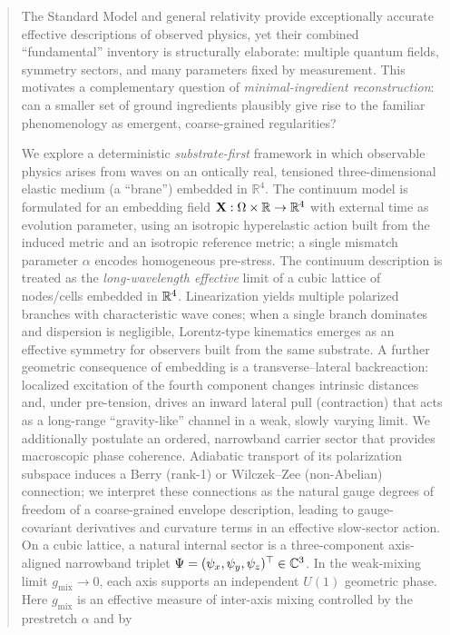 \begin{abstract}
The Standard Model and general relativity provide exceptionally accurate effective descriptions of observed physics,
yet their combined ``fundamental'' inventory is structurally elaborate: multiple quantum fields, symmetry sectors,
and many parameters fixed by measurement.
This motivates a complementary question of \emph{minimal-ingredient reconstruction}:
can a smaller set of ground ingredients plausibly give rise to the familiar phenomenology as emergent,
coarse-grained regularities?

We explore a deterministic \emph{substrate-first} framework in which observable physics arises from waves on an
ontically real, tensioned three-dimensional elastic medium (a ``brane'') embedded in $\mathbb{R}^4$.
The continuum model is formulated for an embedding field $\vecX:\Omega\times\mathbb{R}\to\mathbb{R}^4$ with external
time as evolution parameter, using an isotropic hyperelastic action built from the induced metric and an
isotropic reference metric; a single mismatch parameter $\alpha$ encodes homogeneous pre-stress.
The continuum description is treated as the \emph{long-wavelength effective} limit of a cubic lattice of
nodes/cells embedded in $\R^4$.
Linearization yields multiple polarized branches with characteristic wave cones; when a single branch dominates and
dispersion is negligible, Lorentz-type kinematics emerges as an effective symmetry for observers built from the same
substrate.
A further geometric consequence of embedding is a transverse--lateral backreaction: localized excitation of the
fourth component changes intrinsic distances and, under pre-tension, drives an inward lateral pull (contraction) that
acts as a long-range ``gravity-like'' channel in a weak, slowly varying limit.
We additionally postulate an ordered, narrowband carrier sector that provides macroscopic phase coherence.
Adiabatic transport of its polarization subspace induces a Berry (rank-1) or Wilczek--Zee (non-Abelian) connection;
we interpret these connections as the natural gauge degrees of freedom of a coarse-grained envelope description,
leading to gauge-covariant derivatives and curvature terms in an effective slow-sector action.
On a cubic lattice, a natural internal sector is a three-component axis-aligned narrowband triplet
$\Psi=(\psi_x,\psi_y,\psi_z)^\top\in\C^3$.
In the weak-mixing limit $g_{\mathrm{mix}}\to 0$, each axis supports an independent $U(1)$ geometric phase.
Here $g_{\mathrm{mix}}$ is an effective measure of inter-axis mixing controlled by the prestretch $\alpha$ and by

\end{abstract}
